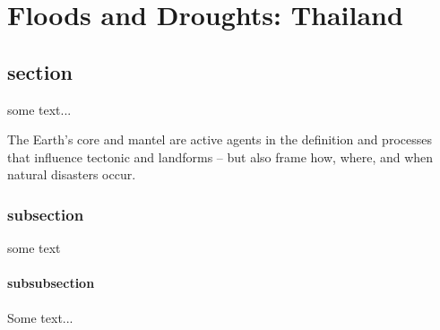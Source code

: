 \chapter{Floods and Droughts: Thailand}

\section{section}

some text...

The Earth's core and mantel are active agents in the definition and processes that influence tectonic and landforms -- but also frame how, where, and when natural disasters occur. 

\subsection{subsection}

some text

\subsubsection{subsubsection}

Some text...